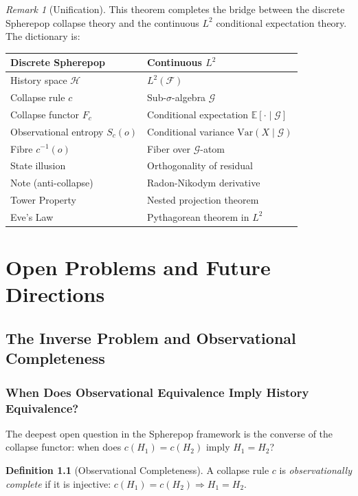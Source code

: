 \documentclass[12pt, a4paper, openany]{book}
\theoremstyle{plain}
\theoremstyle{definition}
\newtheorem{definition}[theorem]{Definition}
\theoremstyle{remark}
\newtheorem{remark}[theorem]{Remark}
\newcommand{\calH}{\mathcal{H}}
\begin{document}
\begin{remark}[Unification]
This theorem completes the bridge between the discrete Spherepop collapse theory
and the continuous $L^2$ conditional expectation theory. The dictionary is:

\begin{center}
\begin{tabular}{ll}
\toprule
Discrete Spherepop & Continuous $L^2$ \\
\midrule
History space $\calH$ & $L^2(\mathcal{F})$ \\
Collapse rule $c$ & Sub-$\sigma$-algebra $\mathcal{G}$ \\
Collapse functor $F_c$ & Conditional expectation $\mathbb{E}[\cdot\mid\mathcal{G}]$ \\
Observational entropy $S_c(o)$ & Conditional variance $\mathrm{Var}(X\mid\mathcal{G})$ \\
Fibre $c^{-1}(o)$ & Fiber over $\mathcal{G}$-atom \\
State illusion & Orthogonality of residual \\
Note (anti-collapse) & Radon-Nikodym derivative \\
Tower Property & Nested projection theorem \\
Eve's Law & Pythagorean theorem in $L^2$ \\
\bottomrule
\end{tabular}
\end{center}
\end{remark}

\part{Open Problems and Future Directions}

\chapter{The Inverse Problem and Observational Completeness}

\section{When Does Observational Equivalence Imply History Equivalence?}

The deepest open question in the Spherepop framework is the converse of the
collapse functor: when does $c(H_1) = c(H_2)$ imply $H_1 = H_2$?

\begin{definition}[Observational Completeness]
A collapse rule $c$ is \emph{observationally complete} if it is injective:
$c(H_1) = c(H_2) \Rightarrow H_1 = H_2$.
\end{definition}
\end{document}
